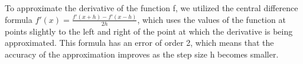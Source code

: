 To approximate the derivative of the function f, we utilized the central difference formula $f'(x) = \frac{f'(x+h) - f'(x-h)}{2h}$, which uses the values of the function at points slightly to the left and right of the point at which the derivative is being approximated. This formula has an error of order 2, which means that the accuracy of the approximation improves as the step size h becomes smaller.


